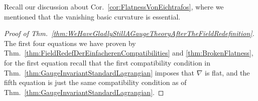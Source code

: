 \begin{remark}
\leavevmode\newline
Recall our discussion about Cor.~\ref{cor:FlatnessVonEichtrafos}, where we mentioned that the vanishing basic curvature is essential.
\end{remark}

\begin{proof}[Proof of Thm.~\ref{thm:WeHaveGladlyStillAGaugeTheoryAfterTheFieldRedefinition}]
\leavevmode\newline
The first four equations we have proven by Thm.~\ref{thm:FieldRedefDerEinfacherenCompatibilities} and \ref{thm:BrokenFlatness}, for the first equation recall that the first compatibility condition in Thm.~\ref{thm:GaugeInvariantStandardLagrangian} imposes that $\nabla$ is flat, and the fifth equation is just the same compatibility condition as of Thm.~\ref{thm:GaugeInvariantStandardLagrangian}.


\end{proof}
